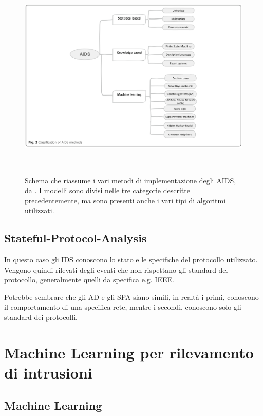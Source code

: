 \begin{figure}[htpb]
    \centering
    \includegraphics[width=\textwidth,height=10cm,keepaspectratio=true]{img/aids_classification.png}
    \caption{
        Schema che riassume i vari metodi di implementazione degli AIDS, da \cite{SurveyIntrusionDetection2019}. I modelli sono divisi nelle tre categorie descritte precedentemente, ma sono presenti anche i vari tipi di algoritmi utilizzati.
    }
    \label{fig:aids_classification}
\end{figure}


\subsection{Stateful-Protocol-Analysis}

In questo caso gli IDS conoscono lo stato e le specifiche del protocollo utilizzato. Vengono quindi rilevati degli eventi che non rispettano gli standard del protocollo, generalmente quelli da specifica e.g. IEEE.

Potrebbe sembrare che gli AD e gli SPA siano simili, in realtà i primi, conoscono il comportamento di una specifica rete,  mentre i secondi, conoscono solo gli standard dei protocolli.



\section{Machine Learning per rilevamento di intrusioni}


\subsection{Machine Learning}

